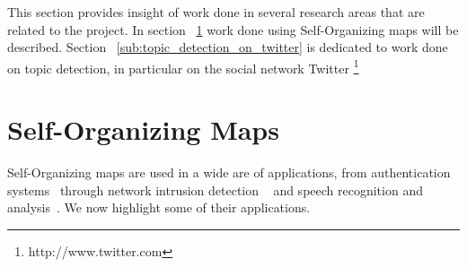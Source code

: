 
This section provides insight of work done in several research areas that are related to the project. In section ~\ref{sec:self_organizing_maps} work done using Self-Organizing maps will be described. Section ~\ref{sub:topic_detection_on_twitter} is dedicated to work done on topic detection, in particular on the social network Twitter \footnote{http://www.twitter.com}

\section{Self-Organizing Maps} 
\label{sec:self_organizing_maps}
Self-Organizing maps are used in a wide are of applications, from authentication systems~\cite{Dozono2012} through network intrusion detection ~\cite{intrusion_som} and speech recognition and analysis~\cite{phonetic_typewiter}. We now highlight some of their applications.

